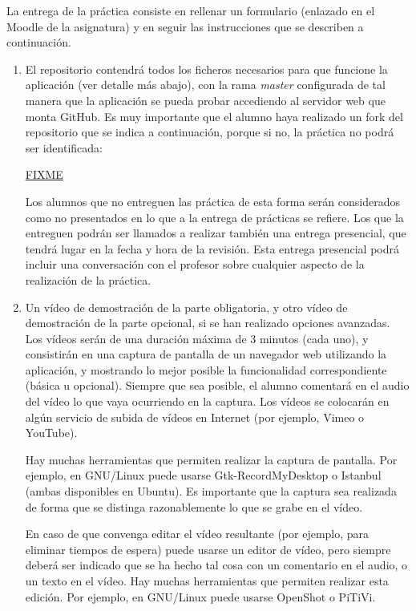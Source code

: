 La entrega de la práctica consiste en rellenar un formulario (enlazado en el Moodle de la asignatura) y en seguir las instrucciones que se describen a continuación.

\begin{enumerate}
  \item El repositorio contendrá todos los ficheros necesarios para que funcione la aplicación (ver detalle más abajo), con la rama \emph{master} configurada de tal manera que la aplicación se pueda probar accediendo al servidor web que monta GitHub. Es muy importante que el alumno haya realizado un fork del repositorio que se indica a continuación, porque si no, la práctica no podrá ser identificada: 

\url{FIXME} 

Los alumnos que no entreguen las práctica de esta forma serán considerados como no presentados en lo que a la entrega de prácticas se refiere. Los que la entreguen podrán ser llamados a realizar también una entrega presencial, que tendrá lugar en la fecha y hora de la revisión. Esta entrega presencial podrá incluir una conversación con el profesor sobre cualquier aspecto de la realización de la práctica.

 \item Un vídeo de demostración de la parte obligatoria, y otro vídeo de demostración de la parte opcional, si se han realizado opciones avanzadas. Los vídeos serán de una duración máxima de 3 minutos (cada uno), y consistirán en una captura de pantalla de un navegador web utilizando la aplicación, y mostrando lo mejor posible la funcionalidad correspondiente (básica u opcional). Siempre que sea posible, el alumno comentará en el audio del vídeo lo que vaya ocurriendo en la captura. Los vídeos se colocarán en algún servicio de subida de vídeos en Internet (por ejemplo, Vimeo o YouTube).

Hay muchas herramientas que permiten realizar la captura de pantalla. Por ejemplo, en GNU/Linux puede usarse Gtk-RecordMyDesktop o Istanbul (ambas disponibles en Ubuntu). Es importante que la captura sea realizada de forma que se distinga razonablemente lo que se grabe en el vídeo.

En caso de que convenga editar el vídeo resultante (por ejemplo, para eliminar tiempos de espera) puede usarse un editor de vídeo, pero siempre deberá ser indicado que se ha hecho tal cosa con un comentario en el audio, o un texto en el vídeo. Hay muchas herramientas que permiten realizar esta edición. Por ejemplo, en GNU/Linux puede usarse OpenShot o PiTiVi.


\end{enumerate}
